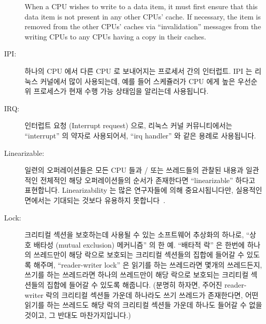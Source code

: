 \begin{description}
	When a CPU wishes to write to a data item, it must first ensure
	that this data item is not present in any other CPUs' cache.
	If necessary, the item is removed from the other CPUs' caches
	via ``invalidation'' messages from the writing CPUs to any
	CPUs having a copy in their caches.
	\fi
\item[IPI:]
	하나의 CPU 에서 다른 CPU 로 보내어지는 프로세서 간의 인터럽트.
	IPI 는 리눅스 커널에서 많이 사용되는데, 예를 들어 스케쥴러가 CPU 에게
	높은 우선순위 프로세스가 현재 수행 가능 상태임을 알리는데 사용됩니다.
	\iffalse

	Inter-processor interrupt, which is an
	interrupt sent from one CPU to another.
	IPIs are used heavily in the Linux kernel, for example, within
	the scheduler to alert CPUs that a high-priority process is now
	runnable.
	\fi
\item[IRQ:]
	인터럽트 요청 (Interrupt request) 으로, 리눅스 커널 커뮤니티에서는
	``interrupt'' 의 약자로 사용되어서, ``irq handler'' 와 같은 용례로
	사용됩니다.
	\iffalse

	Interrupt request, often used as an abbreviation for ``interrupt''
	within the Linux kernel community, as in ``irq handler''.
	\fi
\item[Linearizable:]
	일련의 오퍼레이션들은 모든 CPU 들과 / 또는 쓰레드들의 관찰된 내용과
	일관적인 전체적인 해당 오퍼레이션들의 순서가 존재한다면
	``linearizable'' 하다고 표현합니다.
	Linearizability 는 많은 연구자들에 의해 중요시됩니다만, 실용적인
	면에서는 기대되는 것보다 유용하지
	못합니다~\cite{AndreasHaas2012FIFOisnt}.
	\iffalse

	A sequence of operations is ``linearizable'' if there is at
	least one global ordering of the sequence that is consistent
	with the observations of all CPUs and/or threads.
	Linearizability is much prized by many researchers, but less
	useful in practice than one might
	expect~\cite{AndreasHaas2012FIFOisnt}.
	\fi
\item[Lock:]
	크리티컬 섹션을 보호하는데 사용될 수 있는 소프트웨어 추상화의 하나로, 
	``상호 배타성 (mutual exclusion) 메커니즘'' 의 한 예.
	``배타적 락'' 은 한번에 하나의 쓰레드만이 해당 락으로 보호되는 크리티컬
	섹션들의 집합에 들어갈 수 있도록 해주며, ``reader-writer lock'' 은
	읽기를 하는 쓰레드라면 몇개의 쓰레드든지, 쓰기를 하는 쓰레드라면 하나의
	쓰레드만이 해당 락으로 보호되는 크리티컬 섹션들의 집합에 들어갈 수
	있도록 해줍니다.  (분명히 하자면, 주어진 reader-writer 락의 크리티컬
	섹션들 가운데 하나라도 쓰기 쓰레드가 존재한다면, 어떤 읽기를 하는
	쓰레드도 해당 락의 크리티컬 섹션들 가운데 하나도 들어갈 수 없을 것이고,
	그 반대도 마찬가지입니다.)
	\iffalse


\end{description}
